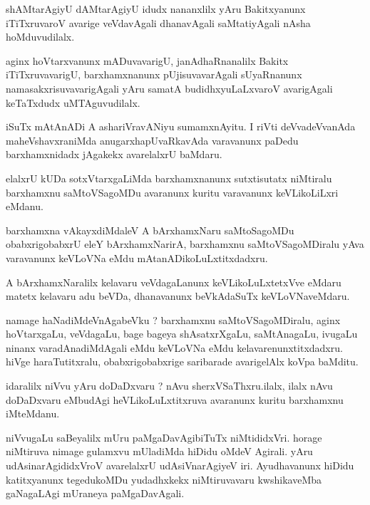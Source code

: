 \documentclass{article}
\begin{document}
\begin{mn}
shAMtarAgiyU dAMtarAgiyU idudx nananxlilx yAru Bakitxyanunx iTiTxruvaroV avarige 
veVdavAgali  dhanavAgali  saMtatiyAgali  nAsha hoMduvudilalx.
\end{mn}

\begin{mn}
aginx hoVtarxvanunx mADuvavarigU, janAdhaRnanalilx  Bakitx iTiTxruvavarigU, barxhamxnanunx  pUjisuvavarAgali 
sUyaRnanunx namasakxrisuvavarigAgali yAru samatA budidhxyuLaLxvaroV avarigAgali keTaTxdudx uMTAguvudilalx.
\end{mn}

\begin{mn}
iSuTx mAtAnADi A ashariVravANiyu sumamxnAyitu. I riVti  deVvadeVvanAda  maheVshavxraniMda 
anugarxhapUvaRkavAda  varavanunx paDedu  barxhamxnidadx jAgakekx avarelalxrU baMdaru.
\end{mn}

\begin{mn}
elalxrU kUDa  sotxVtarxgaLiMda barxhamxnanunx sutxtisutatx  niMtiralu barxhamxnu saMtoVSagoMDu 
avaranunx kuritu varavanunx keVLikoLiLxri eMdanu.
\end{mn}

\begin{mn}
barxhamxna vAkayxdiMdaleV  A bArxhamxNaru saMtoSagoMDu obabxrigobabxrU eleY bArxhamxNarirA,  
barxhamxnu  saMtoVSagoMDiralu  yAva  varavanunx  keVLoVNa eMdu mAtanADikoLuLxtitxdadxru.
\end{mn}

\begin{mn}
A bArxhamxNaralilx kelavaru veVdagaLanunx  keVLikoLuLxtetxVve eMdaru matetx 
kelavaru adu beVDa, dhanavanunx beVkAdaSuTx  keVLoVNaveMdaru.
\end{mn}

\begin{mn}
namage haNadiMdeVnAgabeVku ?  barxhamxnu saMtoVSagoMDiralu, aginx hoVtarxgaLu,  veVdagaLu,  
bage bageya  shAsatxrXgaLu, saMtAnagaLu,  ivugaLu ninanx varadAnadiMdAgali  eMdu  keVLoVNa  eMdu 
kelavarenunxtitxdadxru.  hiVge haraTutitxralu,  obabxrigobabxrige saribarade avarigelAlx koVpa baMditu.
\end{mn}

\begin{mn}
idaralilx niVvu yAru doDaDxvaru ?  nAvu sherxVSaThxru.ilalx,  ilalx nAvu doDaDxvaru 
eMbudAgi  heVLikoLuLxtitxruva  avaranunx  kuritu  barxhamxnu iMteMdanu.
\end{mn}

\begin{mn}
niVvugaLu  saBeyalilx  mUru  paMgaDavAgibiTuTx niMtididxVri. horage niMtiruva nimage  
gulamxvu  mUladiMda hiDidu  oMdeV  Agirali. yAru  udAsinarAgididxVroV avarelalxrU  
udAsiVnarAgiyeV  iri.  Ayudhavanunx hiDidu katitxyanunx  tegedukoMDu  yudadhxkekx  niMtiruvavaru  
kwshikaveMba  gaNagaLAgi  mUraneya paMgaDavAgali.
\end{mn}
\end{document}
